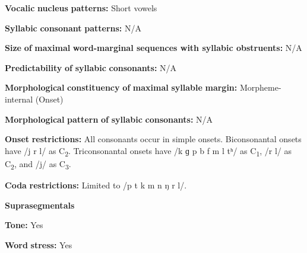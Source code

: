 \documentclass[output=paper]{langsci/langscibook}
\begin{document}
\begin{styleBody}
\textbf{Vocalic} \textbf{nucleus} \textbf{patterns:} Short vowels
\end{styleBody}

\begin{styleBody}
\textbf{Syllabic} \textbf{consonant} \textbf{patterns:} N/A
\end{styleBody}

\begin{styleBody}
\textbf{Size} \textbf{of} \textbf{maximal} \textbf{word{}-marginal sequences with syllabic obstruents:} N/A
\end{styleBody}

\begin{styleBody}
\textbf{Predictability} \textbf{of} \textbf{syllabic} \textbf{consonants:} N/A
\end{styleBody}

\begin{styleBody}
\textbf{Morphological} \textbf{constituency} \textbf{of} \textbf{maximal} \textbf{syllable} \textbf{margin:} Morpheme-internal (Onset)
\end{styleBody}

\begin{styleBody}
\textbf{Morphological} \textbf{pattern} \textbf{of} \textbf{syllabic} \textbf{consonants:} N/A
\end{styleBody}

\begin{styleBody}
\textbf{Onset} \textbf{restrictions:} All consonants occur in simple onsets. Biconsonantal onsets have /j r l/ as C\textsubscript{2}. Triconsonantal onsets have /k ɡ p b f m l tʰ/ as C\textsubscript{1}, /r l/ as C\textsubscript{2}, and /j/ as C\textsubscript{3}.
\end{styleBody}

\begin{styleBody}
\textbf{Coda} \textbf{restrictions:} Limited to /p t k m n ŋ r l/.
\end{styleBody}

\begin{styleBody}
\textbf{Suprasegmentals}
\end{styleBody}

\begin{styleBody}
\textbf{Tone:} Yes
\end{styleBody}

\begin{styleBody}
\textbf{Word} \textbf{stress:} Yes
\end{styleBody}
\end{document}
